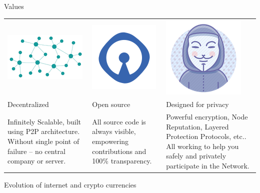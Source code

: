 \documentclass[10pt]{beamer}
\begin{document}
\begin{frame}[t]{Values}
\begin{tabularx} {\textwidth}{|Y|Y|Y|}
    \hline
  \includegraphics[scale=0.3]{static/decentnew} & \includegraphics[scale=0.3]{static/opensource} & \includegraphics[scale=0.3]{static/privacy}\\  
Decentralized & Open source & Designed for privacy\\
Infinitely Scalable, built using P2P architecture. Without single point of failure – no central company or server.   &  All source code is always visible, empowering contributions and 100\% transparency. & Powerful encryption, Node Reputation, Layered Protection Protocols, etc.. All working to help you safely and privately participate in the Network.  \\
    \hline
\end{tabularx}
\end{frame}
    

\begin{frame}[t]{Evolution of internet and crypto currencies}
    
    
\end{frame}    
    
\end{document}
